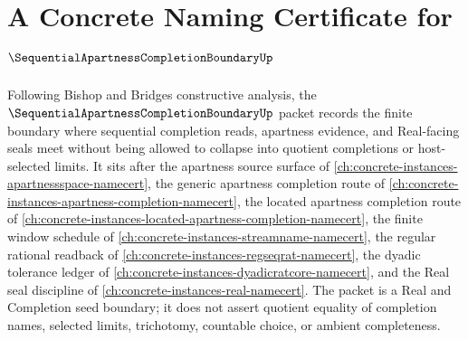 \chapter{A Concrete Naming Certificate for $\SequentialApartnessCompletionBoundaryUp$}
\label{ch:concrete-instances-sequential-apartness-completion-boundary-namecert}

Following Bishop and Bridges constructive analysis, the $\SequentialApartnessCompletionBoundaryUp$ packet records the finite boundary where sequential completion reads, apartness evidence, and Real-facing seals meet without being allowed to collapse into quotient completions or host-selected limits. It sits after the apartness source surface of \autoref{ch:concrete-instances-apartnessspace-namecert}, the generic apartness completion route of \autoref{ch:concrete-instances-apartness-completion-namecert}, the located apartness completion route of \autoref{ch:concrete-instances-located-apartness-completion-namecert}, the finite window schedule of \autoref{ch:concrete-instances-streamname-namecert}, the regular rational readback of \autoref{ch:concrete-instances-regseqrat-namecert}, the dyadic tolerance ledger of \autoref{ch:concrete-instances-dyadicratcore-namecert}, and the Real seal discipline of \autoref{ch:concrete-instances-real-namecert}. The packet is a Real and Completion seed boundary; it does not assert quotient equality of completion names, selected limits, trichotomy, countable choice, or ambient completeness.

